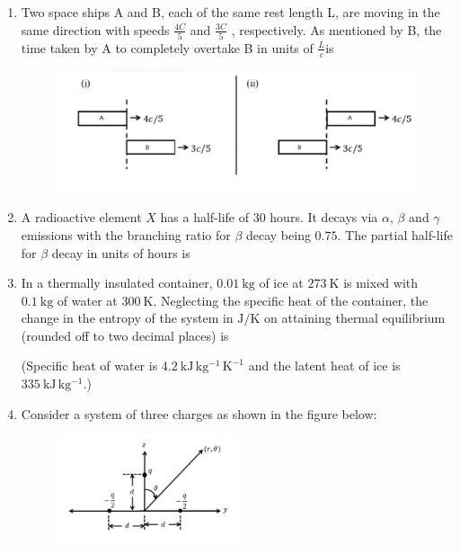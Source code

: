 \documentclass[journal,12pt,onecolumn]{IEEEtran}
\begin{document}
\begin{enumerate}[itemsep=0.45cm]
    \item Two space ships A and B, each of the same rest length L, are moving in the same direction with speeds $\frac{4C}{5}$ and $\frac{3C}{5}$ , respectively. As mentioned by B, the time taken by A to completely overtake B in units of $\frac{L}{c}$is

    \begin{figure}[ht!]
    \centering
    \includegraphics[width=1\textwidth]{fig14.jpeg}
    \caption{}
    \label{fig:fig14.jpeg}
    \end{figure}

    \hfill{}

    \item A radioactive element $X$ has a half-life of $30$ hours. It decays via $\alpha$, $\beta$ and $\gamma$ emissions with the branching ratio for $\beta$ decay being $0.75$. The partial half-life for $\beta$ decay in units of hours is

    \hfill{}

   \item In a thermally insulated container, $0.01\ \mathrm{kg}$ of ice at $273\ \mathrm{K}$ is mixed with $0.1\ \mathrm{kg}$ of water at $300\ \mathrm{K}$. Neglecting the specific heat of the container, the change in the entropy of the system in $\mathrm{J/K}$ on attaining thermal equilibrium (rounded off to two decimal places) is  

  

  (Specific heat of water is $4.2\ \mathrm{kJ\,kg^{-1}\,K^{-1}}$ and the latent heat of ice is $335\ \mathrm{kJ\,kg^{-1}}$.)

   \hfill{}

   \newpage

   \item Consider a system of three charges as shown in the figure below:

   \begin{figure}[ht!]
    \centering
    \includegraphics[width=0.5\textwidth]{fig15.jpeg}
    \caption{}
    \label{fig:fig15.jpeg}
    \end{figure}


\end{enumerate}
\end{document}
